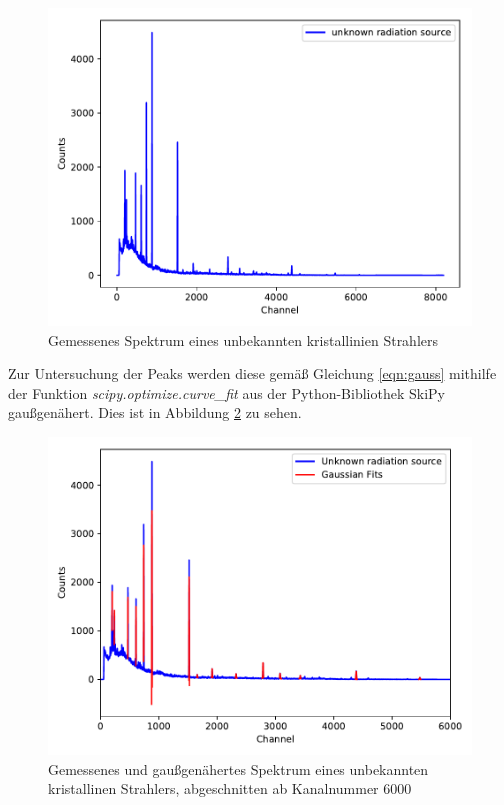 \begin{figure}
  \centering
  \includegraphics[scale=0.7]{content/plot41.pdf}
  \caption{Gemessenes Spektrum eines unbekannten kristallinien Strahlers}
  \label{fig:plot41}
\end{figure}

Zur Untersuchung der Peaks werden diese gemäß Gleichung \eqref{eqn:gauss} 
mithilfe der Funktion \textit{scipy.optimize.curve\_fit} aus der Python-Bibliothek SkiPy gaußgenähert.
Dies ist in Abbildung \ref{fig:plot4} zu sehen.

\begin{figure}
  \centering
  \includegraphics[scale=0.7]{content/plot4.pdf}
  \caption{Gemessenes und gaußgenähertes Spektrum eines unbekannten kristallinen Strahlers,
           abgeschnitten ab Kanalnummer $\num{6000}$}
  \label{fig:plot4} 
\end{figure}

